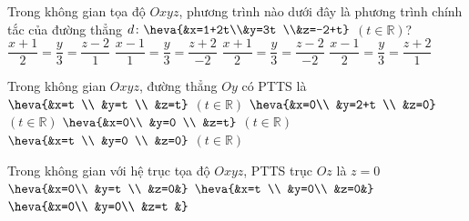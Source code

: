 	\begin{ex}%
		Trong không gian tọa độ $Oxyz$, phương trình nào dưới đây là phương trình chính tắc của đường thẳng $d\colon\heva{&x=1+2t\\&y=3t \\&z=-2+t}$ $(t\in\mathbb{R})$?
		\choice
		{$\dfrac{x+1}{2}=\dfrac{y}{3}=\dfrac{z-2}{1}$}
		{$\dfrac{x-1}{1}=\dfrac{y}{3}=\dfrac{z+2}{-2}$}
		{$\dfrac{x+1}{2}=\dfrac{y}{3}=\dfrac{z-2}{-2}$}
		{\True $\dfrac{x-1}{2}=\dfrac{y}{3}=\dfrac{z+2}{1}$}
\end{ex}
\begin{ex}%
	Trong không gian $Oxyz$, đường thẳng $Oy$ có PTTS là
	\choice
	{$\heva{&x=t \\
		&y=t \\
		&z=t}$ $(t \in \mathbb{R})$} 
	{\True $\heva{&x=0\\
		&y=2+t \\
		&z=0}$ $(t \in \mathbb{R})$}
	{$\heva{&x=0\\
		&y=0 \\
		&z=t}$ $(t \in \mathbb{R})$}
	{$\heva{&x=t \\
		&y=0 \\
		&z=0}$ $(t \in \mathbb{R})$}
\end{ex}
\begin{ex}%
	Trong không gian với hệ trục tọa độ $Oxyz$, PTTS trục $Oz$ là
	\choice
	{$z=0$}
	{$\heva{&x=0\\
			&y=t \\
			&z=0&}$}
	{$\heva{&x=t \\
			&y=0\\
			&z=0&}$}
	{\True $\heva{&x=0\\
			&y=0\\
			&z=t
			&}$}
\end{ex}
